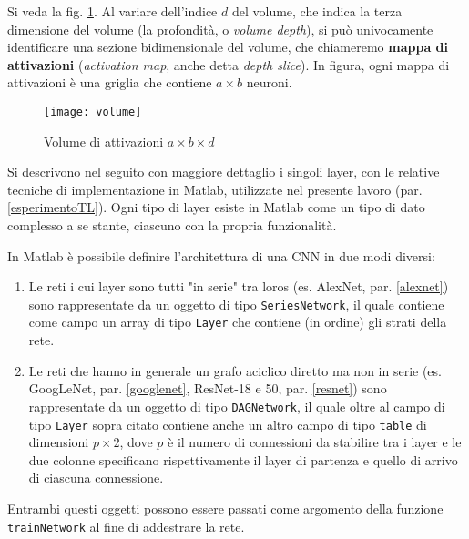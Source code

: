 Si veda la fig. \ref{fig:volume}. Al variare dell'indice $d$ del volume, che indica la terza dimensione del volume (la profondità, o \textit{volume depth}), si può univocamente identificare una sezione bidimensionale del volume, che chiameremo \textbf{mappa di attivazioni} (\textit{activation map}, anche detta \textit{depth slice}). In figura, ogni mappa di attivazioni è una griglia che contiene $a\times b$ neuroni.

\begin{figure}[h!]
\centering
\texttt{[image: volume]}
\caption{Volume di attivazioni $a\times b\times d$}
\label{fig:volume}
\end{figure}


Si descrivono nel seguito con maggiore dettaglio i singoli layer, con le relative tecniche di implementazione in Matlab, utilizzate nel presente lavoro (par. \ref{esperimentoTL}).
Ogni tipo di layer esiste in Matlab come un tipo di dato complesso a se stante, ciascuno con la propria funzionalità.

In Matlab è possibile definire l'architettura di una CNN in due modi diversi:
\begin{enumerate}
\item Le reti i cui layer sono tutti "in serie" tra loros (es. AlexNet, par. \ref{alexnet}) sono rappresentate da un oggetto di tipo \verb|SeriesNetwork|, il quale contiene come campo un array di tipo \verb|Layer| che contiene (in ordine) gli strati della rete.
\item Le reti che hanno in generale un grafo aciclico diretto ma non in serie (es. GoogLeNet, par. \ref{googlenet}, ResNet-18 e 50, par. \ref{resnet}) sono rappresentate da un oggetto di tipo \verb|DAGNetwork|, il quale oltre al campo di tipo \verb|Layer| sopra citato contiene anche un altro campo di tipo \verb|table| di dimensioni $p\times 2$, dove $p$ è il numero di connessioni da stabilire tra i layer e le due colonne specificano rispettivamente il layer di partenza e quello di arrivo di ciascuna connessione.
\end{enumerate}

Entrambi questi oggetti possono essere passati come argomento della funzione \verb|trainNetwork| al fine di addestrare la rete.

